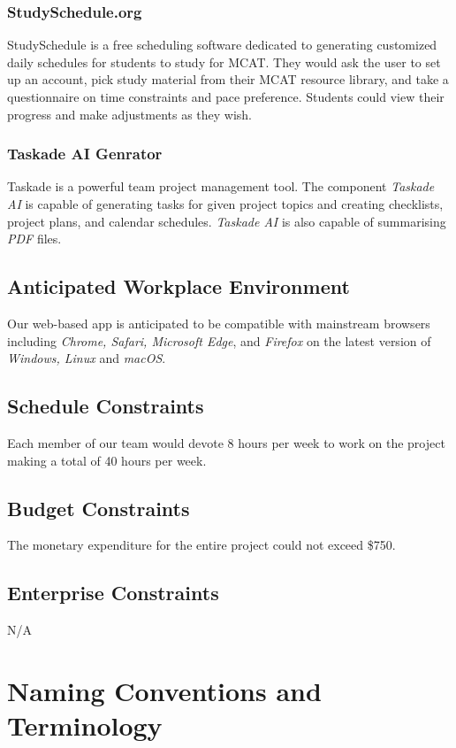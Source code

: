 \documentclass[12pt]{article}
\begin{document}
\subsubsection{StudySchedule.org}
StudySchedule is a free scheduling software dedicated to generating customized daily schedules for students to study for MCAT. They would ask the user to set up an account, pick study material from their MCAT resource library, and take a questionnaire on time constraints and pace preference. Students could view their progress and make adjustments as they wish.
\subsubsection{Taskade AI Genrator}
Taskade is a powerful team project management tool. The component \textit{Taskade AI} is capable of generating tasks for given project topics and creating checklists, project plans, and calendar schedules. \textit{Taskade AI} is also capable of summarising \textit{PDF} files.
\subsection{Anticipated Workplace Environment}
Our web-based app is anticipated to be compatible with mainstream browsers including \textit{Chrome, Safari, Microsoft Edge}, and \textit{Firefox} on the latest version of \textit{Windows, Linux} and \textit{macOS}.
\subsection{Schedule Constraints}
Each member of our team would devote 8 hours per week to work on the project making a total of 40 hours per week.
\subsection{Budget Constraints}
The monetary expenditure for the entire project could not exceed \$750.
\subsection{Enterprise Constraints}
N/A

\section{Naming Conventions and Terminology}
\end{document}
